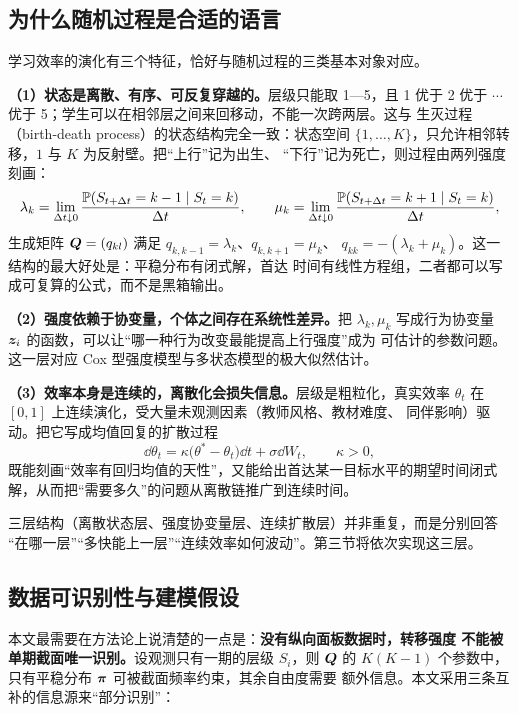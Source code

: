 \subsection{为什么随机过程是合适的语言}

学习效率的演化有三个特征，恰好与随机过程的三类基本对象对应。

\textbf{（1）状态是离散、有序、可反复穿越的。}层级只能取 1—5，且 1 优于 2
优于 $\cdots$ 优于 5；学生可以在相邻层之间来回移动，不能一次跨两层。这与
生灭过程（birth-death process）的状态结构完全一致：状态空间
$\{1,\dots,K\}$，只允许相邻转移，$1$ 与 $K$ 为反射壁。把“上行”记为出生、
“下行”记为死亡，则过程由两列强度刻画：
\begin{equation}
\lambda_k=\lim_{\Delta t\downarrow 0}\frac{\mathbb{P}(S_{t+\Delta t}=k-1\mid S_t=k)}{\Delta t},
\qquad
\mu_k=\lim_{\Delta t\downarrow 0}\frac{\mathbb{P}(S_{t+\Delta t}=k+1\mid S_t=k)}{\Delta t},
\label{eq:rates}
\end{equation}
生成矩阵 $\bm{Q}=(q_{kl})$ 满足 $q_{k,k-1}=\lambda_k$、$q_{k,k+1}=\mu_k$、
$q_{kk}=-(\lambda_k+\mu_k)$。这一结构的最大好处是：平稳分布有闭式解，首达
时间有线性方程组，二者都可以写成可复算的公式，而不是黑箱输出。

\textbf{（2）强度依赖于协变量，个体之间存在系统性差异。}把 $\lambda_k,\mu_k$
写成行为协变量 $\bm{z}_i$ 的函数，可以让“哪一种行为改变最能提高上行强度”成为
可估计的参数问题。这一层对应 Cox 型强度模型与多状态模型的极大似然估计。

\textbf{（3）效率本身是连续的，离散化会损失信息。}层级是粗粒化，真实效率
$\theta_t$ 在 $[0,1]$ 上连续演化，受大量未观测因素（教师风格、教材难度、
同伴影响）驱动。把它写成均值回复的扩散过程
\begin{equation}
\dd\theta_t=\kappa\bigl(\theta^{*}-\theta_t\bigr)\dd t+\sigma\dd W_t,
\qquad \kappa>0,
\label{eq:ou}
\end{equation}
既能刻画“效率有回归均值的天性”，又能给出首达某一目标水平的期望时间闭式
解，从而把“需要多久”的问题从离散链推广到连续时间。

三层结构（离散状态层、强度协变量层、连续扩散层）并非重复，而是分别回答
“在哪一层”“多快能上一层”“连续效率如何波动”。第三节将依次实现这三层。

\subsection{数据可识别性与建模假设}

本文最需要在方法论上说清楚的一点是：\textbf{没有纵向面板数据时，转移强度
不能被单期截面唯一识别。}设观测只有一期的层级 $S_i$，则 $\bm{Q}$ 的
$K(K-1)$ 个参数中，只有平稳分布 $\bm{\pi}$ 可被截面频率约束，其余自由度需要
额外信息。本文采用三条互补的信息源来“部分识别”：

